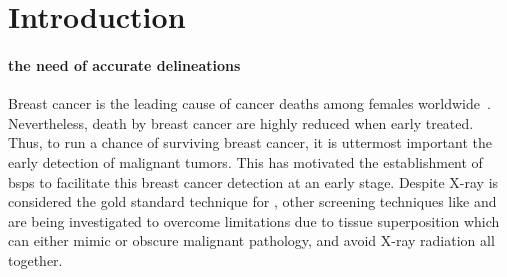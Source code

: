 \graphicspath{ {./content/intro/figures/} }

\section*{Introduction}
\label{sec:intro}  %

\paragraph{the need of accurate delineations}
\label{sec:intro:to_delinations}  %

Breast cancer is the leading cause of cancer deaths among females worldwide~\cite{cancerStatistics2011}.
Nevertheless, death by breast cancer are highly reduced when early treated.
Thus, to run a chance of surviving breast cancer, it is uttermost important the early detection of malignant tumors.
This has motivated the establishment of \acp{bsp} to facilitate this breast cancer detection at an early stage.
Despite X-ray \dm is considered the gold standard technique for \bsp, other screening techniques like \us and \mri are being investigated
to overcome \dm limitations due to tissue superposition which can either mimic or obscure malignant pathology,
and avoid X-ray radiation all together.



